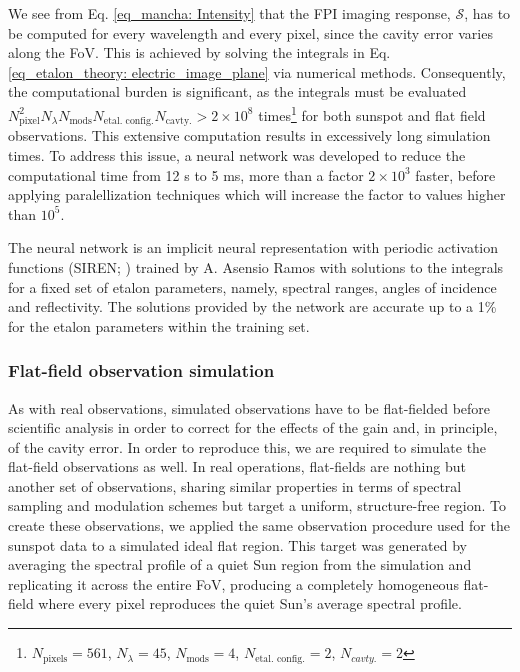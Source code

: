 We see from Eq. \eqref{eq_mancha: Intensity} that the FPI imaging response, $\mathcal{S}$, has to be computed for every wavelength and every pixel, since the cavity error varies along the FoV. This is achieved by solving the integrals in Eq. \eqref{eq_etalon_theory: electric_image_plane} via numerical methods. Consequently, the computational burden is significant, as the integrals must be evaluated $N_{\text{pixel}} ^2 N_{\lambda} N_{\text{mods}} N_{\text{etal. config.}} N_{\text{cavty.}} > 2\times10 ^8$ times\footnote[2]{$N_{\text{pixels}} = 561$, $N_{\lambda} = 45$, $N_{\text{mods}} = 4$, $N_{\text{etal. config.}} = 2$, $N_{cavty.} = 2$} for both sunspot and flat field observations. This extensive computation results in excessively long simulation times. To address this issue, a neural network was developed to reduce the computational time from 12 s to 5 ms, more than a factor $2\times10 ^3$ faster, before applying paralellization techniques which will increase the factor to values higher than $10^{5}$.  

The neural network is an implicit neural representation with periodic activation functions (SIREN; \citealt{siren}) trained by A. Asensio Ramos with solutions to the integrals for a fixed set of etalon parameters, namely, spectral ranges, angles of incidence and reflectivity. The solutions provided by the network are accurate up to a 1\% for the etalon parameters within the training set. 

\subsubsection{Flat-field observation simulation}

As with real observations, simulated observations have to be flat-fielded before scientific analysis in order to correct for the effects of the gain and, in principle, of the cavity error. In order to reproduce this, we are required to simulate the flat-field observations as well. In real operations, flat-fields are nothing but another set of observations, sharing similar properties in terms of spectral sampling and modulation schemes but target a uniform, structure-free region. To create these observations, we applied the same observation procedure used for the sunspot data to a simulated ideal flat region. This target was generated by averaging the spectral profile of a quiet Sun region from the simulation and replicating it across the entire FoV, producing a completely homogeneous flat-field where every pixel reproduces the quiet Sun's average spectral profile.


